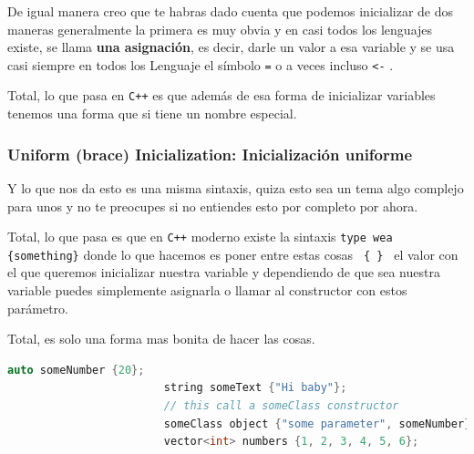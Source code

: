 \documentclass[12pt, fleqn]{report}                             %
\theoremstyle{break}                                            %
\newcommand{\textCode}[1]  { \texttt{#1} }                      %
\newcommand{\Cpp}{\ignorespaces\textCode{C++}}                  %
\begin{document}
                    De igual manera creo que te habras dado cuenta que podemos inicializar de dos maneras
                    generalmente la primera es muy obvia y en casi todos los lenguajes existe, se llama
                    \textbf{una asignación}, es decir, darle un valor a esa variable y se usa casi siempre en
                    todos los Lenguaje el símbolo \textCode{=} o a veces incluso \textCode{<-}.

                    Total, lo que pasa en \Cpp es que además de esa forma de inicializar variables tenemos
                    una forma que si tiene un nombre especial.

                \subsubsection{Uniform (brace) Inicialization: Inicialización uniforme}

                    Y lo que nos da esto es una misma sintaxis, quiza esto sea un tema algo complejo
                    para unos y no te preocupes si no entiendes esto por completo por ahora.

                    Total, lo que pasa es que en \Cpp moderno existe la sintaxis 
                    \textCode{type wea \{something\}} donde lo que hacemos es poner entre estas cosas
                    \textCode{ \{ \} } el valor con el que queremos inicializar nuestra variable y dependiendo
                    de que sea nuestra variable puedes simplemente asignarla o llamar al constructor con estos
                    parámetro.

                    Total, es solo una forma mas bonita de hacer las cosas.
                    \begin{lstlisting}[language=C++, gobble=24]
                        auto someNumber {20};   
                        string someText {"Hi baby"};
                        // this call a someClass constructor
                        someClass object {"some parameter", someNumber};
                        vector<int> numbers {1, 2, 3, 4, 5, 6};
                    \end{lstlisting}
\end{document}
